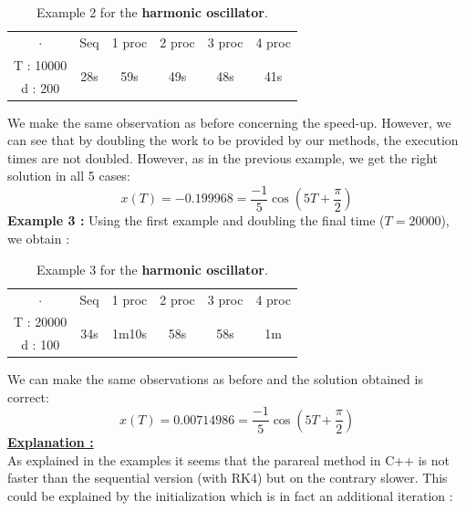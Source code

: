 \begin{enumerate}[label=\textbullet]
\begin{itemize}[label=-]
\begin{table}[H]
			\centering
			\begin{tabular}{| c || c | c | c | c | c |}
				\hline
				\multirow{2}{1.5 cm}{$\cdot$} & \multirow{2}{1.5 cm}{Seq} & \multirow{2}{1.5 cm}{1 proc} & \multirow{2}{1.5 cm}{2 proc} & \multirow{2}{1.5 cm}{3 proc} &\multirow{2}{1.5 cm}{4 proc} \\
				& & & & & \\
				\hline 
				T : 10000 & \multirow{2}{1.5 cm}{28s} & \multirow{2}{1.5 cm}{59s} & \multirow{2}{1.5 cm}{49s} & \multirow{2}{1.5 cm}{48s} & \multirow{2}{1.5 cm}{41s} \\
				d : 200 & & & & & \\
				\hline 
			\end{tabular}
			\caption{Example 2 for the \textbf{harmonic oscillator}.}
			\label{time}
		\end{table}
		We make the same observation as before concerning the speed-up. However, we can see that by doubling the work to be provided by our methods, the execution times are not doubled. However, as in the previous example, we get the right solution in all 5 cases:
		$$x(T)=-0.199968=\frac{-1}{5}\cos\left(5T+\frac{\pi}{2}\right)$$
		\textbf{Example 3 :} Using the first example and doubling the final time ($T=20000$), we obtain :
		\begin{table}[H]
			\centering
			\begin{tabular}{| c || c | c | c | c | c |}
				\hline
				\multirow{2}{1.5 cm}{$\cdot$} & \multirow{2}{1.5 cm}{Seq} & \multirow{2}{1.5 cm}{1 proc} & \multirow{2}{1.5 cm}{2 proc} & \multirow{2}{1.5 cm}{3 proc} &\multirow{2}{1.5 cm}{4 proc} \\
				& & & & & \\
				\hline 
				T : 20000 & \multirow{2}{1.5 cm}{34s} & \multirow{2}{1.5 cm}{1m10s} & \multirow{2}{1.5 cm}{58s} & \multirow{2}{1.5 cm}{58s} & \multirow{2}{1.5 cm}{1m} \\
				d : 100 & & & & & \\
				\hline 
			\end{tabular}
			\caption{Example 3 for the \textbf{harmonic oscillator}.}
			\label{time_osc_3}
		\end{table}
		We can make the same observations as before and the solution obtained is correct:
		$$x(T)=0.00714986=\frac{-1}{5}\cos\left(5T+\frac{\pi}{2}\right)$$
		\underline{\textbf{Explanation :}} \\
		As explained in the examples it seems that the parareal method in C++ is not faster than the sequential version (with RK4) but on the contrary slower. This could be explained by the initialization which is in fact an additional iteration :

\end{itemize}
\end{enumerate}
